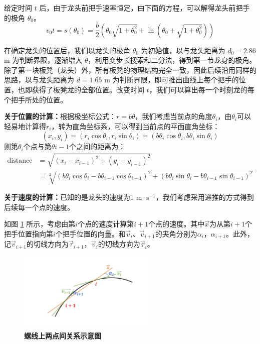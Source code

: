 \documentclass[zihao=-4, UTF8]{article}		%
\theoremstyle{MyLineTheoremStyle} %
\theoremstyle{MyBlockTheoremStyle} %
\theoremstyle{MySubsubsectionStyle} %
\begin{document}
给定时间 $t$ 后，由于龙头前把手速率恒定，由下面的方程，可以解得龙头前把手的极角 $\theta_0$。
\begin{equation}
v_0t = s(\theta_0) = \frac{b}{2}\left( \theta_0\sqrt{1+\theta_0^2} + \ln (\theta_0 + \sqrt{1+\theta_0^2}) \right)
\end{equation}

在确定龙头的位置后，我们以龙头的极角 $\theta_0$ 为初始值，以与龙头距离为 $d_0 = 2.86$ m 为判断界限，逐渐增大 $\theta$，利用变步长搜索和二分法，得到第一节龙身的极角。
除了第一块板凳（龙头）外，所有板凳的物理结构完全一致，因此后续沿用同样的思路，以与龙头距离为 $d = 1.65$ m 为判断界限，即可推出曲线上每个把手的位置，也即获得了板凳龙的全部位置。改变时间 $t$，我们可以算出每一个时刻龙的每个把手所处的位置。

\textbf{关于位置的计算：}根据极坐标公式：$r=b\theta$，我们考虑当前点的角度$\theta_{i}$，由$\theta_{i}$可以轻易地计算得$r_{i}$，转为直角坐标系，可以得到当前点的平面直角坐标： 
\begin{equation}
(x_i,y_i) = (r_i\cos\theta_i, r_i \sin\theta_i) = (b \theta_i \cos\theta_i, b \theta_i \sin\theta_i)
\end{equation}
则第$\theta_{i}$个点与第$\theta{i-1}$个之间的距离为：
\begin{align*}
\text{distance} &= \sqrt{(x_i-x_{i-1})^2 + (y_i-y_{i-1})^2} \\
 &= \sqrt[2]{(b \theta_i \cos\theta_i - b \theta_{i-1} \cos\theta_{i-1})^2 + (b \theta_i \sin\theta_i - b \theta_{i-1} \sin\theta_{i-1})^2}
\end{align*}


\textbf{关于速度的计算：}已知的是龙头的速度为1 $\mathrm{m}\cdot \mathrm{s}^{-1}$，我们考虑采用递推的方式得到后续每一个点的速度。

如图 \ref*{螺线上两点间关系示意图} 所示，考虑由第$i$个点的速度计算第$i+1$个点的速度。其中$\vec{x}$为从第$i+1$个把手位置指向第$i$个把手位置的向量。和$\vec{v}_{i}$、$\vec{v}_{i+1}$的夹角分别为$\alpha_{i}$，$\alpha_{i+1}$。此外，记$\vec{v}_{i+1}$的切线方向为$\vec{\tau}_{i+1}$，$\vec{v}_{i}$的切线方向为$\vec{\tau}_{i}$。

\begin{figure}[H]
    \centering
    \includegraphics[width=0.6\textwidth]{assets/getv.pdf}
    \caption{\textbf{螺线上两点间关系示意图}}
    \label{螺线上两点间关系示意图}
\end{figure}
\end{document}
